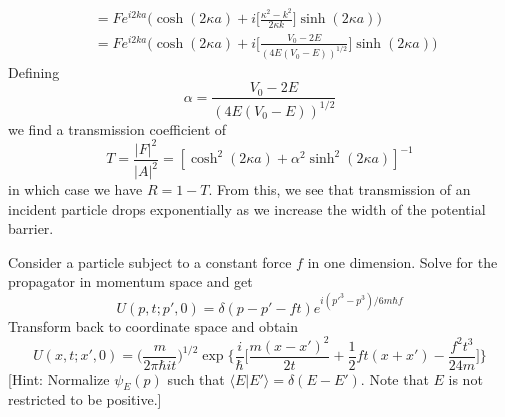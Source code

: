 \documentclass[../principles-of-quantum-mechanics.tex]{subfiles}
\begin{document}
\begin{questions}
\begin{solution}
\begin{align*}
			&= Fe^{i2ka}\Big(\cosh(2\kappa a) + i\Big[\frac{\kappa^2 - k^2}{2\kappa k}\Big]\sinh(2\kappa a)\Big) \\
			&= Fe^{i2ka}\Big(\cosh(2\kappa a) + i\Big[\frac{V_0 - 2E}{(4E(V_0 - E))^{1/2}}\Big]\sinh(2\kappa a)\Big)
		\end{align*}
		Defining
		$$\alpha = \frac{V_0 - 2E}{(4E(V_0 - E))^{1/2}}$$
		we find a transmission coefficient of
		$$T = \frac{|F|^2}{|A|^2} = [\cosh^2(2\kappa a) + \alpha^2\sinh^2(2\kappa a)]^{-1}$$
		in which case we have $R = 1 - T$. From this, we see that transmission of an incident particle drops exponentially as we increase the width of the potential barrier.
	\end{solution}
	
	\question Consider a particle subject to a constant force $f$ in one dimension. Solve for the propagator in momentum space and get
	$$U(p, t;p', 0) = \delta(p - p' - ft)e^{i(p'^3-p^3)/6m\hbar f}$$
	Transform back to coordinate space and obtain
	$$U(x, t;x', 0) = \Big(\frac{m}{2\pi\hbar it}\Big)^{1/2}\exp\Big\{\frac{i}{\hbar}\Big[\frac{m(x - x')^2}{2t} + \frac{1}{2}ft(x + x') - \frac{f^2t^3}{24m}\Big]\Big\}$$
	[Hint: Normalize $\psi_E(p)$ such that $\langle E|E'\rangle = \delta(E - E')$. Note that $E$ is not restricted to be positive.]
	

\end{questions}
\end{document}

